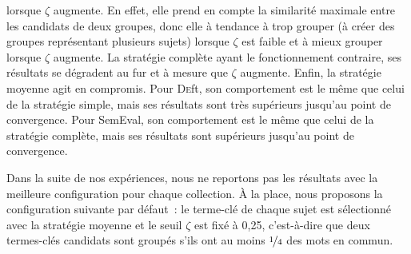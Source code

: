         lorsque $\zeta$ augmente. En effet, elle prend en compte la similarité
        maximale entre les candidats de deux groupes, donc elle à tendance à
        trop grouper (à créer des groupes représentant plusieurs sujets) lorsque
        $\zeta$ est faible et à mieux grouper lorsque $\zeta$ augmente. La
        stratégie complète ayant le fonctionnement contraire, ses résultats se
        dégradent au fur et à mesure que $\zeta$ augmente. Enfin, la stratégie
        moyenne agit en compromis. Pour \textsc{De}ft, son comportement est le
        même que celui de la stratégie simple, mais ses résultats sont très
        supérieurs jusqu'au point de convergence. Pour SemEval, son comportement
        est le même que celui de la stratégie complète, mais ses résultats sont
        supérieurs jusqu'au point de convergence.

        Dans la suite de nos expériences, nous ne reportons pas les résultats
        avec la meilleure configuration pour chaque collection. À la place, nous
        proposons la configuration suivante par défaut~: le terme-clé de chaque
        sujet est sélectionné avec la stratégie moyenne et le seuil $\zeta$ est
        fixé à 0,25, c'est-à-dire que deux termes-clés candidats sont groupés
        s'ils ont au moins $\unitfrac{1}{4}$ des mots en commun.

